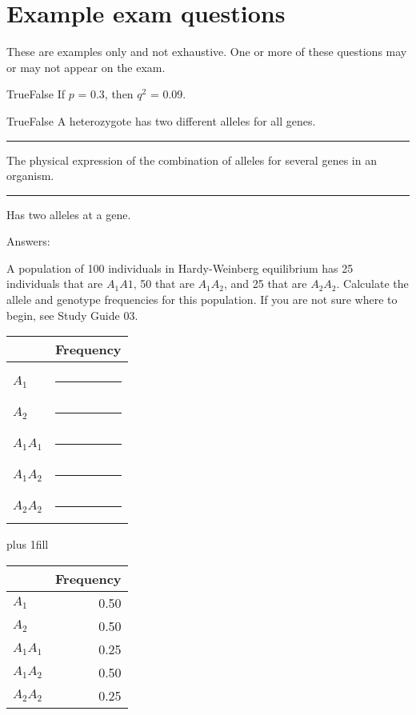 \documentclass[letterpaper]{tufte-handout}
\begin{document}
\section*{Example exam questions}

These are examples only and not exhaustive. One or more of these questions may or may not appear on the exam.

\bigskip

\noindent True\hspace{1em}False\hspace{1em} If $p$ = 0.3, then $q^2$ = 0.09.

\bigskip 

\noindent True\hspace{1em}False\hspace{1em} A heterozygote has two different alleles for all genes.

\bigskip

\noindent \rule{1in}{0.4pt} The physical expression of the combination of alleles for several genes in an organism.

\bigskip

\noindent \rule{1in}{0.4pt} Has two alleles at a gene.



\vspace*{4\baselineskip}

\hfill Answers: 

\vspace*{1\baselineskip}

\noindent A population of 100 individuals in Hardy-Weinberg equilibrium
has 25 individuals that are $A_1A1$, 50 that are $A_1A_2$, and 25 
that are $A_2A_2$. Calculate the allele and genotype frequencies 
for this population. If you are not sure where to begin, see Study Guide 03.

\bigskip

\begin{tabular}{@{}ll@{}}
	\toprule
	& Frequency\tabularnewline
	\midrule
	& \tabularnewline
	$A_1$		&	\rule{0.6in}{0.4pt}\tabularnewline[2em]
	$A_2$		&	\rule{0.6in}{0.4pt}\tabularnewline[2em]
	$A_1A_1$	&	\rule{0.6in}{0.4pt}\tabularnewline[2em]
	$A_1A_2$	&	\rule{0.6in}{0.4pt}\tabularnewline[2em]
	$A_2A_2$	&	\rule{0.6in}{0.4pt}\tabularnewline
	\bottomrule
\end{tabular}


\vskip0pt plus 1fill

\begin{margintable}
\hfill \begin{tabular}{@{}lr@{}}
	\toprule
	& Frequency\tabularnewline
	\midrule
	$A_1$		&	0.50\tabularnewline
	$A_2$		&	0.50\tabularnewline
	$A_1A_1$	&	0.25\tabularnewline
	$A_1A_2$	&	0.50\tabularnewline
	$A_2A_2$	&	0.25\tabularnewline
	\bottomrule
\end{tabular}
\end{margintable}
\end{document}
